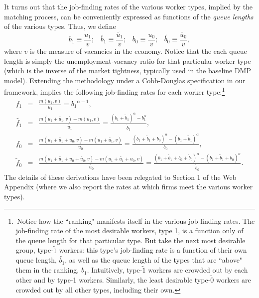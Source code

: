 \documentclass[12pt]{article} %
\theoremstyle{definition}
\begin{document}
It turns out that the job-finding rates of the various worker types, implied by the \cite{petrongolo2001looking} matching process, can be conveniently expressed as functions of the \textit{queue lengths} of the various types. Thus, we define 
\begin{equation}
b_1\equiv \frac{u_1}{v};\,\,\,\,\, \tilde{b_1}\equiv \frac{\tilde{u_1}}{v}; \,\,\,\,\, b_0\equiv \frac{u_0}{v};\,\,\,\,\, \tilde{b_0}\equiv \frac{\tilde{u_0}}{v}, \label{eq queue lengths}
\end{equation}where $v$ is the measure of vacancies in the economy. Notice that the each queue length is simply the unemployment-vacancy ratio for that particular worker type (which is the inverse of the market tightness, typically used in the baseline DMP model). Extending the \cite{petrongolo2001looking} methodology under a Cobb-Douglas specification in our framework, implies the following job-finding rates for each worker type:\footnote{\,Notice how the ``ranking" manifests itself in the various job-finding rates. The job-finding rate of the most desirable workers, type 1, is a function only of the queue length for that particular type. But take the next most desirable group, type-$\tilde{1}$ workers: this type's job-finding rate is a function of their own queue length, $\tilde{b_1}$, as well as the queue length of the types that are ``above" them in the ranking, $b_1$. Intuitively, type-$\tilde{1}$ workers are crowded out by each other and by type-1 workers. Similarly, the least desirable type-$\tilde{0}$ workers are crowded out by all other types, including their own.} 
\begin{eqnarray*}
    f_1 &=& \frac{m(u_1,v)}{u_1} = {b_1}^{\alpha-1},\nonumber  \\
     \tilde{f_1} &=& \frac{m(u_1+\tilde{u_1},v)-m(u_1,v)}{\tilde{u_1}} = \frac{(b_1+\tilde{b}_1)^\alpha - b_1^\alpha}{\tilde{b}_1},  \nonumber \\
    f_0 &=& \frac{m(u_1+\tilde{u_1}+u_0,v)-m(u_1+\tilde{u_1},v)}{u_0} = \frac{(b_1+\tilde{b}_1+b_0)^\alpha - (b_1+\tilde{b}_1)^\alpha}{b_0}, \nonumber \\
    \tilde{f}_0 &=& \frac{m(u_1+\tilde{u_1}+u_0+\tilde{u_0},v)-m(u_1+\tilde{u_1}+u_0,v)}{\tilde{u_0}} = \frac{(b_1+\tilde{b}_1+b_0+\tilde{b}_0)^\alpha - ({b_1+\tilde{b}_1+b_0})^\alpha}{\tilde{b}_0}. \nonumber 
\end{eqnarray*}
The details of these derivations have been relegated to Section 1 of the Web Appendix (where we also report the rates at which firms meet the various worker types).
\end{document}
